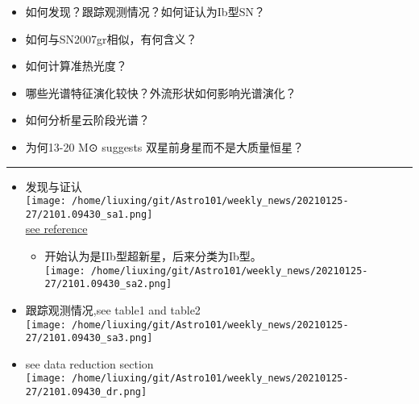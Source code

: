 \documentclass[
]{article}
\begin{document}
\begin{itemize}
\item
  如何发现？跟踪观测情况？如何证认为Ib型SN？
\item
  如何与SN2007gr相似，有何含义？
\item
  如何计算准热光度？
\item
  哪些光谱特征演化较快？外流形状如何影响光谱演化？
\item
  如何分析星云阶段光谱？
\item
  为何13-20 M⊙ suggests 双星前身星而不是大质量恒星？
\end{itemize}

\begin{center}\rule{0.5\linewidth}{0.5pt}\end{center}

\begin{itemize}
\item
  发现与证认\\
  \texttt{[image: /home/liuxing/git/Astro101/weekly\_news/20210125-27/2101.09430\_sa1.png]}\\
  \href{http://www.cbat.eps.harvard.edu/unconf/followups/J22460504-1059484.html}{see
  reference}

  \begin{itemize}
  \item
    开始认为是IIb型超新星，后来分类为Ib型。\\
    \texttt{[image: /home/liuxing/git/Astro101/weekly\_news/20210125-27/2101.09430\_sa2.png]}
  \end{itemize}
\item
  跟踪观测情况,see table1 and table2\\
  \texttt{[image: /home/liuxing/git/Astro101/weekly\_news/20210125-27/2101.09430\_sa3.png]}
\item
  see data reduction section\\
  \texttt{[image: /home/liuxing/git/Astro101/weekly\_news/20210125-27/2101.09430\_dr.png]}


\end{itemize}
\end{document}
